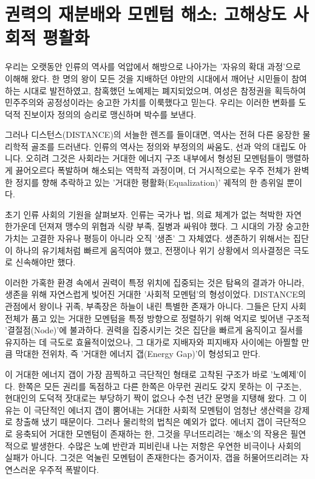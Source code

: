 

\section{권력의 재분배와 모멘텀 해소: 고해상도 사회적 평활화}
우리는 오랫동안 인류의 역사를 억압에서 해방으로 나아가는 '자유의 확대 과정'으로 이해해 왔다. 한 명의 왕이 모든 것을 지배하던 야만의 시대에서 깨어난 시민들이 참여하는 시대로 발전하였고, 참혹했던 노예제는 폐지되었으며, 여성은 참정권을 획득하여 민주주의와 공정성이라는 숭고한 가치를 이룩했다고 믿는다. 우리는 이러한 변화를 도덕적 진보이자 정의의 승리로 맹신하며 박수를 보낸다.

그러나 디스턴스(DISTANCE)의 서늘한 렌즈를 들이대면, 역사는 전혀 다른 웅장한 물리학적 골조를 드러낸다. 인류의 역사는 정의와 부정의의 싸움도, 선과 악의 대립도 아니다. 오히려 그것은 사회라는 거대한 에너지 구조 내부에서 형성된 모멘텀들이 맹렬하게 끓어오르다 폭발하며 해소되는 역학적 과정이며, 더 거시적으로는 우주 전체가 완벽한 정지를 향해 추락하고 있는 '거대한 평활화(Equalization)' 궤적의 한 층위일 뿐이다.

초기 인류 사회의 기원을 살펴보자. 인류는 국가나 법, 의료 체계가 없는 척박한 자연 한가운데 던져져 맹수의 위협과 식량 부족, 질병과 싸워야 했다. 그 시대의 가장 숭고한 가치는 고결한 자유나 평등이 아니라 오직 '생존' 그 자체였다. 생존하기 위해서는 집단이 하나의 유기체처럼 빠르게 움직여야 했고, 전쟁이나 위기 상황에서 의사결정은 극도로 신속해야만 했다.

이러한 가혹한 환경 속에서 권력이 특정 위치에 집중되는 것은 탐욕의 결과가 아니라, 생존을 위해 자연스럽게 빚어진 거대한 '사회적 모멘텀'의 형성이었다. DISTANCE의 관점에서 왕이나 귀족, 부족장은 하늘이 내린 특별한 존재가 아니다. 그들은 단지 사회 전체가 품고 있는 거대한 모멘텀을 특정 방향으로 정렬하기 위해 억지로 빚어낸 구조적 '결절점(Node)'에 불과하다. 권력을 집중시키는 것은 집단을 빠르게 움직이고 질서를 유지하는 데 극도로 효율적이었으나, 그 대가로 지배자와 피지배자 사이에는 아찔할 만큼 막대한 전위차, 즉 '거대한 에너지 갭(Energy Gap)'이 형성되고 만다.

이 거대한 에너지 갭이 가장 끔찍하고 극단적인 형태로 고착된 구조가 바로 '노예제'이다. 한쪽은 모든 권리를 독점하고 다른 한쪽은 아무런 권리도 갖지 못하는 이 구조는, 현대인의 도덕적 잣대로는 부당하기 짝이 없으나 수천 년간 문명을 지탱해 왔다. 그 이유는 이 극단적인 에너지 갭이 뿜어내는 거대한 사회적 모멘텀이 엄청난 생산력을 강제로 창출해 냈기 때문이다. 그러나 물리학의 법칙은 예외가 없다. 에너지 갭이 극단적으로 응축되어 거대한 모멘텀이 존재하는 한, 그것을 무너뜨리려는 '해소'의 작용은 필연적으로 발생한다. 수많은 노예 반란과 피비린내 나는 저항은 우연한 비극이나 사회의 실패가 아니다. 그것은 억눌린 모멘텀이 존재한다는 증거이자, 갭을 허물어뜨리려는 자연스러운 우주적 폭발이다.

